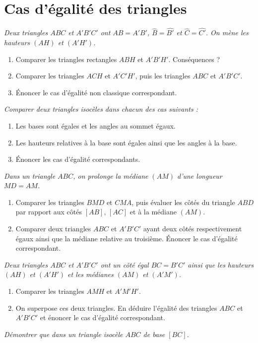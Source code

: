 \chapter{Cas d'égalité des triangles}

\begin{itemize}
\it Deux triangles $ABC$ et $A'B'C'$ ont $AB=A'B'$, $\widehat{B}=\widehat{B'}$ et $\widehat{C}=\widehat{C'}$. On mène les hauteurs $(AH)$ et $(A'H')$.\begin{enumerate}
\item Comparer les triangles rectangles $ABH$ et $A'B'H'$. Conséquences ?
\item Comparer les triangles $ACH$ et $A'C'H'$, puis les triangles $ABC$ et $A'B'C'$. 
\item Énoncer le cas d'égalité non classique correspondant.
\end{enumerate}
\it Comparer deux triangles isocèles dans chacun des cas suivants : 
\begin{enumerate}
\item Les bases sont égales et les angles au sommet égaux.
\item Les hauteurs relatives à la base sont égales ainsi que les angles à la base. 
\item Énoncer les cas d'égalité correspondants. 
\end{enumerate}
\it Dans un triangle $ABC$, on prolonge la médiane $(AM)$ d'une longueur $MD=AM$. 
\begin{enumerate}
\item Comparer les triangles $BMD$ et $CMA$, puis évaluer les côtés du triangle $ABD$ par rapport aux côtés $[AB]$, $[AC]$ et à la médiane $(AM)$. 
\item Comparer deux triangles $ABC$ et $A'B'C'$ ayant deux côtés respectivement égaux ainsi que la médiane relative au troisième. Énoncer le cas d'égalité correspondant. 
\end{enumerate}
\it Deux triangles $ABC$ et $A'B'C'$ ont un côté égal $BC=B'C'$ ainsi que les hauteurs $(AH)$ et $(A'H')$ et les médianes $(AM)$ et $(A'M')$. 
\begin{enumerate}
\item Comparer les triangles $AMH$ et $A'M'H'$.
\item On superpose ces deux triangles. En déduire l'égalité des triangles $ABC$ et $A'B'C'$ et énoncer le cas d'égalité correspondant. 
\end{enumerate}
\it Démontrer que dans un triangle isocèle $ABC$ de base $[BC]$. \begin{enumerate}

\end{enumerate}
\end{itemize}
